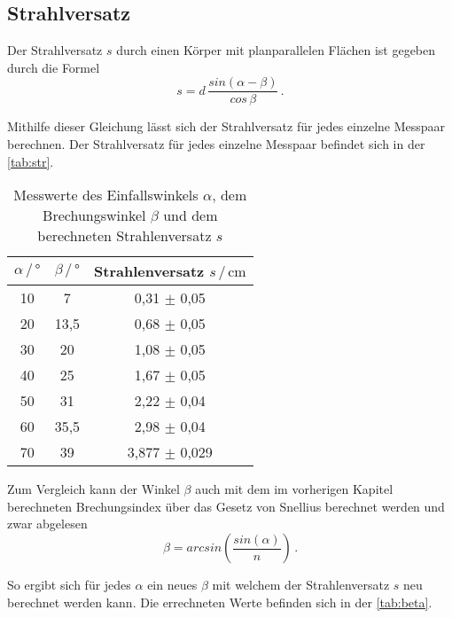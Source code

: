 \subsection{Strahlversatz}
Der Strahlversatz $s$ durch einen Körper mit planparallelen Flächen ist gegeben durch die Formel
\begin{equation}
    s = d \, \frac{sin(\alpha - \beta)}{cos \, \beta} \, .
\end{equation}

\noindent
Mithilfe dieser Gleichung lässt sich der Strahlversatz für jedes einzelne Messpaar berechnen. Der Strahlversatz für jedes einzelne Messpaar 
befindet sich in der \autoref{tab:str}.

\begin{table}
    \centering
    \caption{Messwerte des Einfallswinkels $\alpha$, dem Brechungswinkel $\beta$ und dem berechneten Strahlenversatz $s$}
    \label{tab:str}
    \begin{tabular}{c c c}
    \toprule
         $\alpha \, / \, ° $ & $\beta \, / \, °$ & Strahlenversatz $s  \, / \, \si{\centi\meter}$\\
    \midrule
    10 & 7    & 0,31  $\pm$  0,05\\
    20 & 13,5 & 0,68  $\pm$  0,05\\
    30 & 20   & 1,08  $\pm$  0,05\\
    40 & 25   & 1,67  $\pm$  0,05\\
    50 & 31   & 2,22  $\pm$  0,04\\
    60 & 35,5 & 2,98  $\pm$  0,04\\
    70 & 39   & 3,877 $\pm$  0,029\\
    \bottomrule
    \end{tabular}
\end{table}

\noindent
Zum Vergleich kann der Winkel $\beta$ auch mit dem im vorherigen Kapitel berechneten Brechungsindex über das Gesetz von Snellius berechnet werden und zwar abgelesen
\begin{equation}
    \beta = arcsin\left(\frac{sin(\alpha)}{n}\right) \, .
\end{equation}

\noindent
So ergibt sich für jedes $\alpha$ ein neues $\beta$ mit welchem der Strahlenversatz $s$ neu berechnet werden kann. Die errechneten Werte befinden sich in der \autoref{tab:beta}.

